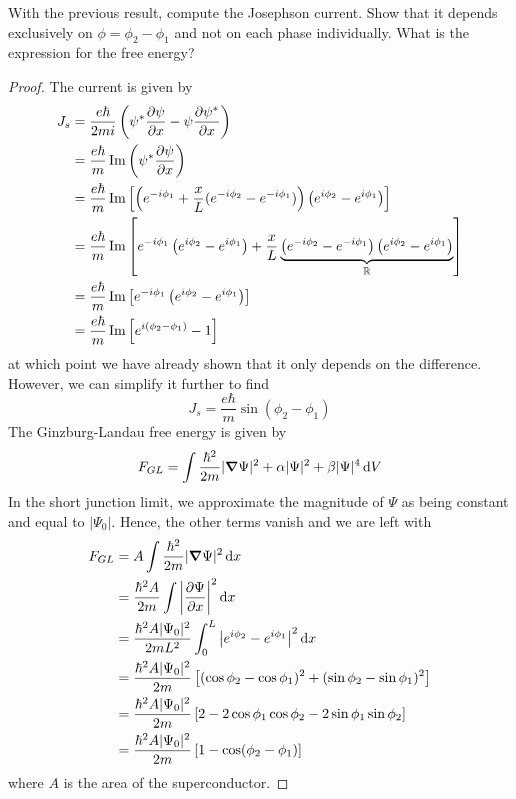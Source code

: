 \begin{Problem}
With the previous result, compute the Josephson current. Show that it depends exclusively on $\phi =\phi_2-\phi_1$ and not on each phase individually. What is the expression for the free energy?	
\end{Problem}
\begin{proof}
	The current is given by
	\begin{align*}
		J_s &= \frac{e\hbar}{2mi}\left(\psi^* \pdv{\psi}{x} - \psi \pdv{\psi^*}{x}\right)\\
		&= \frac{e\hbar}{m}\Im\left(\psi^* \pdv{\psi}{x}\right)\\
		&= \frac{e\hbar}{m}\Im\left[\left(e^{-i\phi_1}+\frac{x}{L}(e^{-i\phi_2}-e^{-i\phi_1})\right)\left(e^{i\phi_2}-e^{i\phi_1}\right)\right]\\
		&=\frac{e\hbar}{m} \Im\left[e^{-i\phi_1}\left(e^{i\phi_2}-e^{i\phi_1}\right) + \frac{x}{L}\underbrace{\left(e^{-i\phi_2}-e^{-i\phi_1}\right)\left(e^{i\phi_2}-e^{i\phi_1}\right)}_{\mathbb{R}}\right]\\
		&= \frac{e\hbar}{m} \Im\left[e^{-i\phi_1}\left(e^{i\phi_2}-e^{i\phi_1}\right)\right]\\
		&= \frac{e\hbar}{m}\Im\left[e^{i(\phi_2-\phi_1)}-1\right]
	\end{align*}
at which point we have already shown that it only depends on the difference. However, we can simplify it further to find
\[J_s = \frac{e\hbar}{m}\sin(\phi_2-\phi_1)\]
The Ginzburg-Landau free energy is given by
\[F_{GL} = \int \frac{\hbar^2}{2m}|\grad{\Psi}|^2 + \alpha |\Psi|^2 + \beta |\Psi|^4\dd{V}\]
In the short junction limit, we approximate the magnitude of $\Psi$ as being constant and equal to $|\Psi_0|$. Hence, the other terms vanish and we are left with
 \begin{align*}
 	F_{GL} &= A \int \frac{\hbar^2}{2m} |\grad{\Psi}|^2\dd{x}\\
 	&= \frac{\hbar^2 A}{2m}\int \left|\pdv{\Psi}{x}\right|^2\dd{x}\\
 	&=\frac{\hbar^2 A|\Psi_0|^2}{2mL^2}\int_0^L \left|e^{i\phi_2}-e^{i\phi_1}\right|^2\dd{x}\\
 	&=\frac{\hbar^2 A|\Psi_0|^2}{2m}\left[(\cos\phi_2 - \cos\phi_1)^2 + (\sin\phi_2-\sin\phi_1)^2\right]\\
 	&=\frac{\hbar^2 A|\Psi_0|^2}{2m}\left[2 - 2\cos\phi_1\cos\phi_2 - 2\sin\phi_1\sin\phi_2\right]\\
 	&= \frac{\hbar^2 A|\Psi_0|^2}{2m}\left[1-\cos(\phi_2-\phi_1)\right]
 \end{align*}
where $A$ is the area of the superconductor.
\end{proof}
